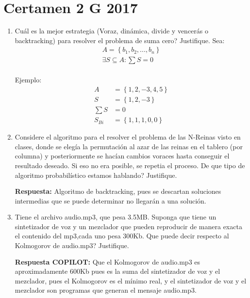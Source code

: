 \documentclass{templateNote}
\begin{document}
\section*{Certamen 2 G 2017}
\begin{enumerate}
    \subsection*{Representación de un arreglo con un arreglo binario (?)}
    \item Cuál es la mejor estrategia (Voraz, dinámica, divide y vencerás o backtracking) para resolver el problema de suma cero? Justifique.
    Sea:
    \begin{align*}
        A = \left\{b_1, b_2, ..., b_n\right\}\\
        \exists S \subseteq A : \sum S = 0 \\
    \end{align*}

    Ejemplo:
    \begin{align*}
        A &= \left\{1, 2, -3, 4, 5\right\}\\
        S &= \left\{1, 2, -3\right\}\\
        \sum S &= 0\\
        S_{Bi} &= \left\{1,1,1,0,0\right\}
    \end{align*}
    
    \item Considere el algoritmo para el resolver el problema de las N-Reinas visto en clases, donde se elegía la permutación al azar de las reinas en el tablero (por columna) y posteriormente se hacían cambios voraces hasta conseguir el resultado deseado. Si eso no era posible, se repetia el proceso. De que tipo de algoritmo probabilístico estamos hablando? Justifique.
    
    \textbf{Respuesta:} Algoritmo de backtracking, pues se descartan soluciones intermedias que se puede determinar no llegarán a una solución.

    \item Tiene el archivo audio.mp3, que pesa 3.5MB. Suponga que tiene un sintetizador de voz y un mezclador que pueden reproducir de manera exacta el contenido del mp3,cada uno pesa 300Kb. Que puede decir respecto al Kolmogorov de audio.mp3? Justifique.
    
    \textbf{Respuesta COPILOT:} Que el Kolmogorov de audio.mp3 es aproximadamente 600Kb pues es la suma del sintetizador de voz y el mezclador, pues el Kolmogorov es el mínimo real, y el sintetizador de voz y el mezclador son programas que generan el mensaje audio.mp3.
\end{enumerate}
\end{document}
